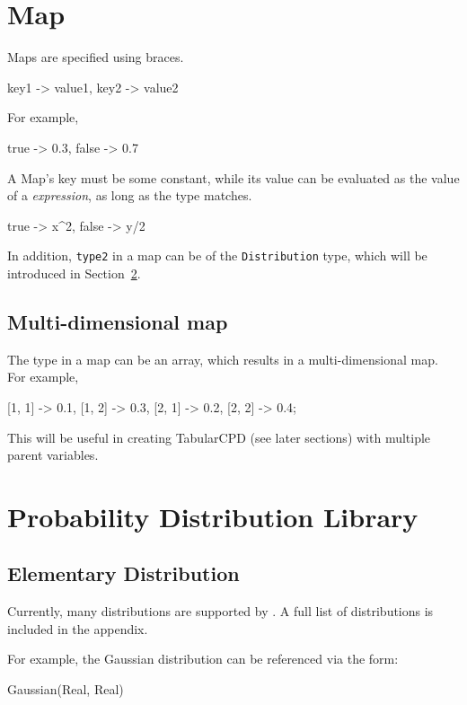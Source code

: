 \documentclass[12pt]{article}
\begin{document}
\section{Map}
Maps are specified using braces. 
\begin{blogcode}
{key1 -> value1, key2 -> value2}
\end{blogcode}

For example, 
\begin{blogcode}
 {true -> 0.3, false -> 0.7}
\end{blogcode}

A Map's key must be some constant, while its value can be evaluated as the value of a \emph{expression}, as long as the type matches.
\begin{blogcode}
{true -> x^2, false -> y/2}
\end{blogcode}

In addition, \texttt{type2} in a map can be of the \texttt{Distribution} type, which will be introduced in Section~\ref{sec:distribution}.

\subsection{Multi-dimensional map}
The type in a map can be an array, which results in a multi-dimensional map.
For example,
\begin{blogcode}
{[1, 1] -> 0.1, [1, 2] -> 0.3, [2, 1] -> 0.2, [2, 2] -> 0.4};
\end{blogcode}

This will be useful in creating TabularCPD (see later sections) with multiple parent variables.


\section{Probability Distribution Library}
\label{sec:distribution}

\subsection{Elementary Distribution}
Currently, many distributions are supported by \bl. A full list of distributions is included in the appendix. 

For example, the Gaussian distribution can be referenced via the form:
\begin{blogcode}
Gaussian(Real, Real)
\end{blogcode}
\end{document}
